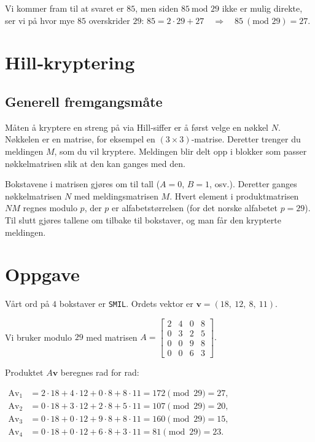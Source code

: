 \documentclass[12pt,a4paper]{article}
\begin{document}
Vi kommer fram til at svaret er $85$, men siden $85\ \text{mod }29$ ikke er
mulig direkte, ser vi på hvor mye $85$ overskrider $29$:
$
85 = 2\cdot 29 + 27 \quad\Longrightarrow\quad 85\ (\text{mod }29)=27 .
$

\section{Hill‑kryptering}
\subsection{Generell fremgangsmåte}
Måten å kryptere en streng på via Hill‑siffer er å først velge en nøkkel
$N$. Nøkkelen er en matrise, for eksempel en $(3\times3)$‑matrise.
Deretter trenger du meldingen $M$, som du vil kryptere. Meldingen blir delt opp
i blokker som passer nøkkelmatrisen slik at den kan ganges med den.

Bokstavene i matrisen gjøres om til tall ($A=0$, $B=1$, osv.). Deretter
ganges nøkkelmatrisen $N$ med meldingsmatrisen $M$. Hvert element i
produktmatrisen $NM$ regnes modulo $p$, der $p$ er alfabetstørrelsen (for
det norske alfabetet $p=29$). Til slutt gjøres tallene om tilbake til bokstaver,
og man får den krypterte meldingen.

\section{Oppgave}
Vårt ord på $4$ bokstaver er \texttt{SMIL}. Ordets vektor er
$
\mathbf{v}= (18,\ 12,\ 8,\ 11).
$

Vi bruker modulo $29$ med matrisen
$
A=
\begin{bmatrix}
2 & 4 & 0 & 8 \\
0 & 3 & 2 & 5 \\
0 & 0 & 9 & 8 \\
0 & 0 & 6 & 3
\end{bmatrix}.
$

Produktet $A\mathbf{v}$ beregnes rad for rad:

$
\begin{aligned}
\text{Av}_{1}&=2\cdot18+4\cdot12+0\cdot8+8\cdot11
               =172\pmod{29}=27,\\[4pt]
\text{Av}_{2}&=0\cdot18+3\cdot12+2\cdot8+5\cdot11
               =107\pmod{29}=20,\\[4pt]
\text{Av}_{3}&=0\cdot18+0\cdot12+9\cdot8+8\cdot11
               =160\pmod{29}=15,\\[4pt]
\text{Av}_{4}&=0\cdot18+0\cdot12+6\cdot8+3\cdot11
               =81\pmod{29}=23.
\end{aligned}
$
\end{document}
